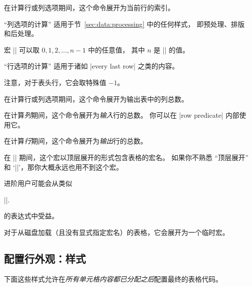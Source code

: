 \documentclass[a4paper,doc2]{ltxdoc}
\begin{document}
\begin{command}{\pgfplotstablerow}
\label{pgfplotstable:page:tablerow}
    在计算行或列选项期间，这个命令展开为当前行的索引。

    ``列选项的计算'' 适用于节~\ref{sec:data:processing} 中的任何样式，
    即预处理、排版和后处理。

    宏 |\pgfplotstablerow| 可以取 $0,1,2,\dotsc,n-1$ 中的任意值，
    其中 $n$ 是 |\pgfplotstablerows| 的值。

    ``行选项的计算'' 适用于诸如 |every last row| 之类的内容。

    注意，对于表头行，它会取特殊值 $-1$。
\end{command}

\begin{command}{\pgfplotstablecols}
    在计算行或列选项期间，这个命令展开为输出表中的列总数。
\end{command}

\begin{command}{\pgfplotstablerows}
    在计算\emph{列}期间，这个命令展开为\emph{输入}行的总数。
    你可以在 |row predicate| 内部使用它。

    在计算\emph{行}期间，这个命令展开为\emph{输出}行的总数。
\end{command}

\begin{command}{\pgfplotstablename}
    在 |\pgfplotstabletypeset| 期间，这个宏以顶层展开的形式包含表格的宏名。
    如果你不熟悉 ``顶层展开'' 和 `|\expandafter|'，那你大概永远也用不到这个宏。

    进阶用户可能会从类似

    |\expandafter\pgfplotstabletypeset\pgfplotstablename|.

    的表达式中受益。

    对于从磁盘加载（且没有显式指定宏名）的表格，它会展开为一个临时宏。
\end{command}


\subsection{配置行外观：样式}

下面这些样式允许在\emph{所有单元格内容都已分配之后}配置最终的表格代码。
\end{document}
